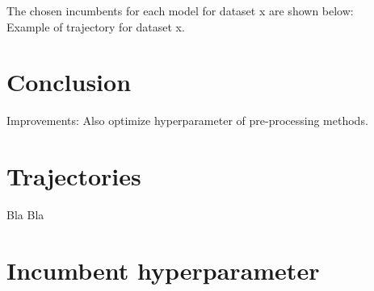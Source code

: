 \documentclass[11pt]{article}
\begin{document}
The chosen incumbents for each model for dataset x are shown below: \\




Example of trajectory for dataset x.


\section{Conclusion}

Improvements: Also optimize hyperparameter of pre-processing methods.







\appendix

\section{Trajectories}

Bla Bla

\section{Incumbent hyperparameter}
\end{document}
